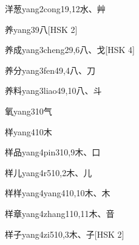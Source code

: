 \begin{entry}{洋葱}{yang2cong1}{9,12}{⽔、⾋}
\end{entry}

\begin{entry}{养}{yang3}{9}{⼋}[HSK 2]
\end{entry}

\begin{entry}{养成}{yang3cheng2}{9,6}{⼋、⼽}[HSK 4]
\end{entry}

\begin{entry}{养分}{yang3fen4}{9,4}{⼋、⼑}
\end{entry}

\begin{entry}{养料}{yang3liao4}{9,10}{⼋、⽃}
\end{entry}

\begin{entry}{氧}{yang3}{10}{⽓}
\end{entry}

\begin{entry}{样}{yang4}{10}{⽊}
\end{entry}

\begin{entry}{样品}{yang4pin3}{10,9}{⽊、⼝}
\end{entry}

\begin{entry}{样儿}{yang4r5}{10,2}{⽊、⼉}
\end{entry}

\begin{entry}{样样}{yang4yang4}{10,10}{⽊、⽊}
\end{entry}

\begin{entry}{样章}{yang4zhang1}{10,11}{⽊、⾳}
\end{entry}

\begin{entry}{样子}{yang4zi5}{10,3}{⽊、⼦}[HSK 2]
\end{entry}

